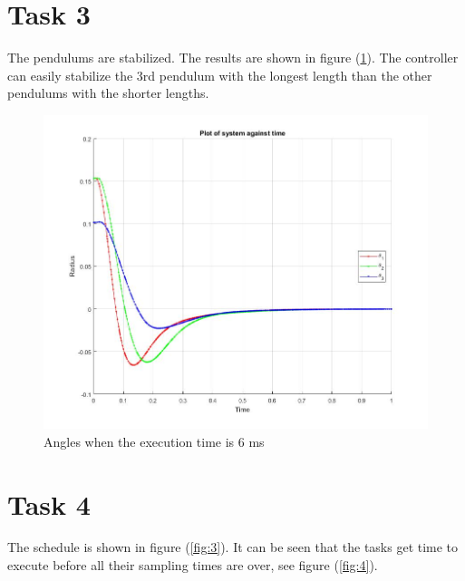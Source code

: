 \documentclass[a4paper,12pt,oneside,onecolumn]{article} %
\begin{document}
\section*{Task 3}
The pendulums are stabilized. The results are shown in figure (\ref{fig:2}). The controller can easily stabilize the 3rd pendulum with the longest length than the other pendulums with the shorter lengths.


\begin{figure}[H]
    \centering
    \includegraphics[scale=0.4]{theta06.jpg}
    \caption{Angles when the execution time is 6 ms}
    \label{fig:2}
\end{figure} 

\section*{Task 4}
The schedule is shown in figure (\ref{fig:3}). It can be seen that the tasks get time to execute before all their sampling times are over, see figure (\ref{fig:4}).
\end{document}
